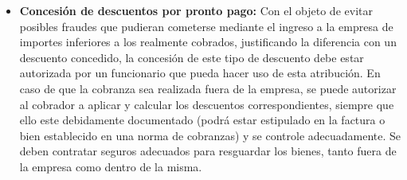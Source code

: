 \begin{itemize}
\item \textbf{Concesión de descuentos por pronto pago:}
Con el objeto de evitar posibles fraudes que pudieran cometerse mediante el ingreso a la empresa
de importes inferiores a los realmente cobrados, justificando la diferencia con un descuento concedido, la
concesión de este tipo de descuento debe estar autorizada por un funcionario que pueda hacer uso de esta
atribución.
En caso de que la cobranza sea realizada fuera de la empresa, se puede autorizar al cobrador a
aplicar y calcular los descuentos correspondientes, siempre que ello este debidamente documentado (podrá
estar estipulado en la factura o bien establecido en una norma de cobranzas) y se controle adecuadamente.
Se deben contratar seguros adecuados para resguardar los bienes, tanto fuera de la empresa como dentro
de la misma.

\end{itemize}

